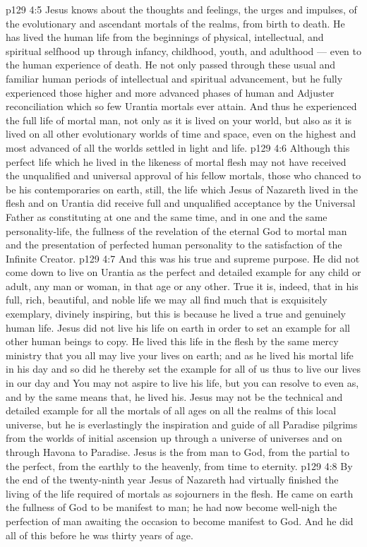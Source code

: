 \vs p129 4:5 Jesus knows about the thoughts and feelings, the urges and impulses, of the evolutionary and ascendant mortals of the realms, from birth to death. He has lived the human life from the beginnings of physical, intellectual, and spiritual selfhood up through infancy, childhood, youth, and adulthood --- even to the human experience of death. He not only passed through these usual and familiar human periods of intellectual and spiritual advancement, but he  fully experienced those higher and more advanced phases of human and Adjuster reconciliation which so few Urantia mortals ever attain. And thus he experienced the full life of mortal man, not only as it is lived on your world, but also as it is lived on all other evolutionary worlds of time and space, even on the highest and most advanced of all the worlds settled in light and life.
\vs p129 4:6 Although this perfect life which he lived in the likeness of mortal flesh may not have received the unqualified and universal approval of his fellow mortals, those who chanced to be his contemporaries on earth, still, the life which Jesus of Nazareth lived in the flesh and on Urantia did receive full and unqualified acceptance by the Universal Father as constituting at one and the same time, and in one and the same personality\hyp{}life, the fullness of the revelation of the eternal God to mortal man and the presentation of perfected human personality to the satisfaction of the Infinite Creator.
\vs p129 4:7 And this was his true and supreme purpose. He did not come down to live on Urantia as the perfect and detailed example for any child or adult, any man or woman, in that age or any other. True it is, indeed, that in his full, rich, beautiful, and noble life we may all find much that is exquisitely exemplary, divinely inspiring, but this is because he lived a true and genuinely human life. Jesus did not live his life on earth in order to set an example for all other human beings to copy. He lived this life in the flesh by the same mercy ministry that you all may live your lives on earth; and as he lived his mortal life in his day and  so did he thereby set the example for all of us thus to live our lives in our day and  You may not aspire to live his life, but you can resolve to  even as, and by the same means that, he lived his. Jesus may not be the technical and detailed example for all the mortals of all ages on all the realms of this local universe, but he is everlastingly the inspiration and guide of all Paradise pilgrims from the worlds of initial ascension up through a universe of universes and on through Havona to Paradise. Jesus is the  from man to God, from the partial to the perfect, from the earthly to the heavenly, from time to eternity.
\vs p129 4:8 \pc By the end of the twenty\hyp{}ninth year Jesus of Nazareth had virtually finished the living of the life required of mortals as sojourners in the flesh. He came on earth the fullness of God to be manifest to man; he had now become well\hyp{}nigh the perfection of man awaiting the occasion to become manifest to God. And he did all of this before he was thirty years of age.
